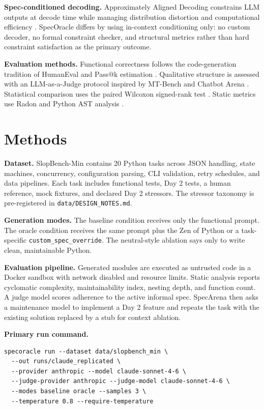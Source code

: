 \documentclass[11pt]{article}
\begin{document}
\textbf{Spec-conditioned decoding.}
Approximately Aligned Decoding constrains LLM outputs at decode time while
managing distribution distortion and computational efficiency
\cite{Melcer2024AprAD}. SpecOracle differs by using in-context conditioning
only: no custom decoder, no formal constraint checker, and structural metrics
rather than hard constraint satisfaction as the primary outcome.

\textbf{Evaluation methods.}
Functional correctness follows the code-generation tradition of HumanEval and
Pass@k estimation \cite{Chen2021HumanEval}. Qualitative structure is assessed
with an LLM-as-a-Judge protocol inspired by MT-Bench and Chatbot Arena
\cite{Zheng2023Judge}. Statistical comparison uses the paired Wilcoxon
signed-rank test \cite{Wilcoxon1945}. Static metrics use Radon and Python AST
analysis \cite{Radon, Peters2004Zen}.

\section{Methods}

\textbf{Dataset.}
SlopBench-Min contains 20 Python tasks across JSON handling, state machines,
concurrency, configuration parsing, CLI validation, retry schedules, and data
pipelines. Each task includes functional tests, Day 2 tests, a human reference,
mock fixtures, and declared Day 2 stressors. The stressor taxonomy is
pre-registered in \texttt{data/DESIGN\_NOTES.md}.

\textbf{Generation modes.}
The baseline condition receives only the functional prompt. The oracle
condition receives the same prompt plus the Zen of Python or a task-specific
\texttt{custom\_spec\_override}. The neutral-style ablation says only to write
clean, maintainable Python.

\textbf{Evaluation pipeline.}
Generated modules are executed as untrusted code in a Docker sandbox with
network disabled and resource limits. Static analysis reports cyclomatic
complexity, maintainability index, nesting depth, and function count. A judge
model scores adherence to the active informal spec. SpecArena then asks a
maintenance model to implement a Day 2 feature and repeats the task with the
existing solution replaced by a stub for context ablation.

\textbf{Primary run command.}
\begin{verbatim}
specoracle run --dataset data/slopbench_min \
  --out runs/claude_replicated \
  --provider anthropic --model claude-sonnet-4-6 \
  --judge-provider anthropic --judge-model claude-sonnet-4-6 \
  --modes baseline oracle --samples 3 \
  --temperature 0.8 --require-temperature
\end{verbatim}
\end{document}
